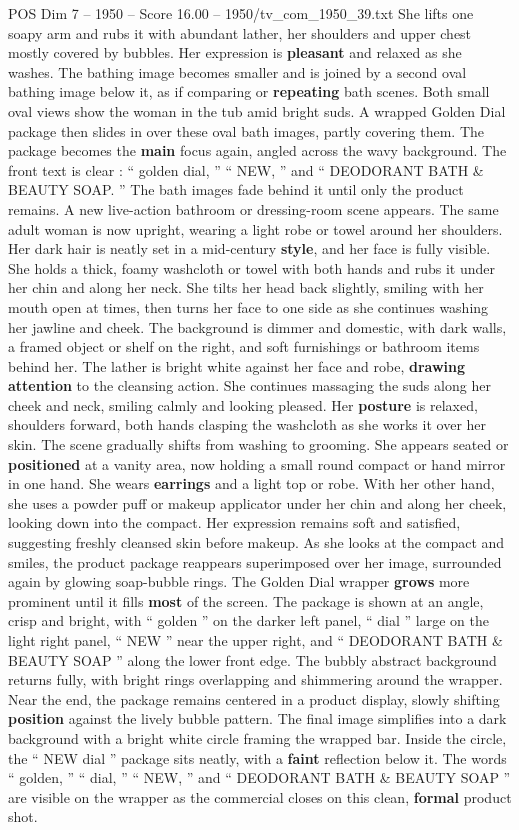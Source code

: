 \begin{textsample}{POS Dim 7 – 1950 – Score 16.00 – 1950/tv\_com\_1950\_39.txt}
She lifts one soapy arm and rubs it with abundant lather, her shoulders and upper chest mostly covered by bubbles.
Her expression is \textbf{pleasant} and relaxed as she washes.
The bathing image becomes smaller and is joined by a second oval bathing image below it, as if comparing or \textbf{repeating} bath scenes.
Both small oval views show the woman in the tub amid bright suds.
A wrapped Golden Dial package then slides in over these oval bath images, partly covering them.
The package becomes the \textbf{main} focus again, angled across the wavy background.
The front text is clear : “ golden dial, ” “ NEW, ” and “ DEODORANT BATH \& BEAUTY SOAP. ” The bath images fade behind it until only the product remains.
A new live-action bathroom or dressing-room scene appears.
The same adult woman is now upright, wearing a light robe or towel around her shoulders.
Her dark hair is neatly set in a mid-century \textbf{style}, and her face is fully visible.
She holds a thick, foamy washcloth or towel with both hands and rubs it under her chin and along her neck.
She tilts her head back slightly, smiling with her mouth open at times, then turns her face to one side as she continues washing her jawline and cheek.
The background is dimmer and domestic, with dark walls, a framed object or shelf on the right, and soft furnishings or bathroom items behind her.
The lather is bright white against her face and robe, \textbf{drawing} \textbf{attention} to the cleansing action.
She continues massaging the suds along her cheek and neck, smiling calmly and looking pleased.
Her \textbf{posture} is relaxed, shoulders forward, both hands clasping the washcloth as she works it over her skin.
The scene gradually shifts from washing to grooming.
She appears seated or \textbf{positioned} at a vanity area, now holding a small round compact or hand mirror in one hand.
She wears \textbf{earrings} and a light top or robe.
With her other hand, she uses a powder puff or makeup applicator under her chin and along her cheek, looking down into the compact.
Her expression remains soft and satisfied, suggesting freshly cleansed skin before makeup.
As she looks at the compact and smiles, the product package reappears superimposed over her image, surrounded again by glowing soap-bubble rings.
The Golden Dial wrapper \textbf{grows} more prominent until it fills \textbf{most} of the screen.
The package is shown at an angle, crisp and bright, with “ golden ” on the darker left panel, “ dial ” large on the light right panel, “ NEW ” near the upper right, and “ DEODORANT BATH \& BEAUTY SOAP ” along the lower front edge.
The bubbly abstract background returns fully, with bright rings overlapping and shimmering around the wrapper.
Near the end, the package remains centered in a product display, slowly shifting \textbf{position} against the lively bubble pattern.
The final image simplifies into a dark background with a bright white circle framing the wrapped bar.
Inside the circle, the “ NEW dial ” package sits neatly, with a \textbf{faint} reflection below it.
The words “ golden, ” “ dial, ” “ NEW, ” and “ DEODORANT BATH \& BEAUTY SOAP ” are visible on the wrapper as the commercial closes on this clean, \textbf{formal} product shot.


\end{textsample}
